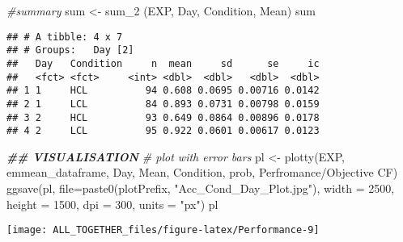 \documentclass[
]{article}
\newenvironment{Shaded}{\begin{snugshade}}{\end{snugshade}}
\newcommand{\AttributeTok}[1]{\textcolor[rgb]{0.77,0.63,0.00}{#1}}
\newcommand{\CommentTok}[1]{\textcolor[rgb]{0.56,0.35,0.01}{\textit{#1}}}
\newcommand{\DecValTok}[1]{\textcolor[rgb]{0.00,0.00,0.81}{#1}}
\newcommand{\DocumentationTok}[1]{\textcolor[rgb]{0.56,0.35,0.01}{\textbf{\textit{#1}}}}
\newcommand{\FunctionTok}[1]{\textcolor[rgb]{0.00,0.00,0.00}{#1}}
\newcommand{\NormalTok}[1]{#1}
\newcommand{\OtherTok}[1]{\textcolor[rgb]{0.56,0.35,0.01}{#1}}
\newcommand{\StringTok}[1]{\textcolor[rgb]{0.31,0.60,0.02}{#1}}
\begin{document}
\begin{Shaded}
\begin{Highlighting}[]
\CommentTok{\#summary  }
\NormalTok{sum }\OtherTok{\textless{}{-}} \FunctionTok{sum\_2}\NormalTok{ (EXP, }\StringTok{\textquotesingle{}Day\textquotesingle{}}\NormalTok{, }\StringTok{\textquotesingle{}Condition\textquotesingle{}}\NormalTok{, }\StringTok{\textquotesingle{}Mean\textquotesingle{}}\NormalTok{)}
\NormalTok{sum}
\end{Highlighting}
\end{Shaded}

\begin{verbatim}
## # A tibble: 4 x 7
## # Groups:   Day [2]
##   Day   Condition     n  mean     sd      se     ic
##   <fct> <fct>     <int> <dbl>  <dbl>   <dbl>  <dbl>
## 1 1     HCL          94 0.608 0.0695 0.00716 0.0142
## 2 1     LCL          84 0.893 0.0731 0.00798 0.0159
## 3 2     HCL          93 0.649 0.0864 0.00896 0.0178
## 4 2     LCL          95 0.922 0.0601 0.00617 0.0123
\end{verbatim}

\begin{Shaded}
\begin{Highlighting}[]
\DocumentationTok{\#\# VISUALISATION}
\CommentTok{\# plot with error bars}
\NormalTok{pl }\OtherTok{\textless{}{-}} \FunctionTok{plotty}\NormalTok{(EXP, emmean\_dataframe, }\StringTok{\textquotesingle{}Day\textquotesingle{}}\NormalTok{,  }\StringTok{\textquotesingle{}Mean\textquotesingle{}}\NormalTok{, }\StringTok{\textquotesingle{}Condition\textquotesingle{}}\NormalTok{, }\StringTok{\textquotesingle{}prob\textquotesingle{}}\NormalTok{, }\StringTok{\textquotesingle{}Perfromance/Objective CF\textquotesingle{}}\NormalTok{) }
\FunctionTok{ggsave}\NormalTok{(pl, }\AttributeTok{file=}\FunctionTok{paste0}\NormalTok{(plotPrefix, }\StringTok{"Acc\_Cond\_Day\_Plot.jpg"}\NormalTok{), }\AttributeTok{width =} \DecValTok{2500}\NormalTok{, }\AttributeTok{height =} \DecValTok{1500}\NormalTok{, }\AttributeTok{dpi =} \DecValTok{300}\NormalTok{, }\AttributeTok{units =} \StringTok{"px"}\NormalTok{)}
\NormalTok{pl}
\end{Highlighting}
\end{Shaded}

\texttt{[image: ALL\_TOGETHER\_files/figure-latex/Performance-9]}
\end{document}
